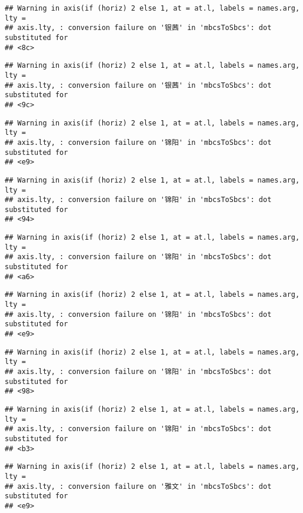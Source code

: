 \documentclass[
]{article}
\begin{document}
\begin{verbatim}
## Warning in axis(if (horiz) 2 else 1, at = at.l, labels = names.arg, lty =
## axis.lty, : conversion failure on '银茜' in 'mbcsToSbcs': dot substituted for
## <8c>
\end{verbatim}

\begin{verbatim}
## Warning in axis(if (horiz) 2 else 1, at = at.l, labels = names.arg, lty =
## axis.lty, : conversion failure on '银茜' in 'mbcsToSbcs': dot substituted for
## <9c>
\end{verbatim}

\begin{verbatim}
## Warning in axis(if (horiz) 2 else 1, at = at.l, labels = names.arg, lty =
## axis.lty, : conversion failure on '锦阳' in 'mbcsToSbcs': dot substituted for
## <e9>
\end{verbatim}

\begin{verbatim}
## Warning in axis(if (horiz) 2 else 1, at = at.l, labels = names.arg, lty =
## axis.lty, : conversion failure on '锦阳' in 'mbcsToSbcs': dot substituted for
## <94>
\end{verbatim}

\begin{verbatim}
## Warning in axis(if (horiz) 2 else 1, at = at.l, labels = names.arg, lty =
## axis.lty, : conversion failure on '锦阳' in 'mbcsToSbcs': dot substituted for
## <a6>
\end{verbatim}

\begin{verbatim}
## Warning in axis(if (horiz) 2 else 1, at = at.l, labels = names.arg, lty =
## axis.lty, : conversion failure on '锦阳' in 'mbcsToSbcs': dot substituted for
## <e9>
\end{verbatim}

\begin{verbatim}
## Warning in axis(if (horiz) 2 else 1, at = at.l, labels = names.arg, lty =
## axis.lty, : conversion failure on '锦阳' in 'mbcsToSbcs': dot substituted for
## <98>
\end{verbatim}

\begin{verbatim}
## Warning in axis(if (horiz) 2 else 1, at = at.l, labels = names.arg, lty =
## axis.lty, : conversion failure on '锦阳' in 'mbcsToSbcs': dot substituted for
## <b3>
\end{verbatim}

\begin{verbatim}
## Warning in axis(if (horiz) 2 else 1, at = at.l, labels = names.arg, lty =
## axis.lty, : conversion failure on '雅文' in 'mbcsToSbcs': dot substituted for
## <e9>
\end{verbatim}
\end{document}
